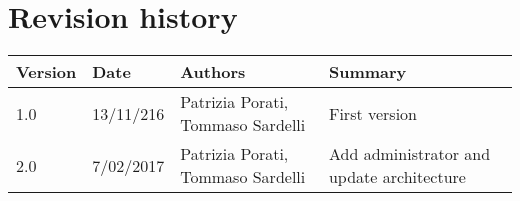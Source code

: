 \section{Revision history}

\begin{tabular}{|l|l|l|p{4cm}|}
	\hline
	\textbf{Version}	& \textbf{Date}	& \textbf{Authors}	& \textbf{Summary}\\
	\hline
	1.0 	& 13/11/216 	& Patrizia Porati, Tommaso Sardelli 	& First version\\
	\hline
	2.0 	& 7/02/2017 	& Patrizia Porati, Tommaso Sardelli 	& Add administrator and update architecture\\
	\hline
\end{tabular}